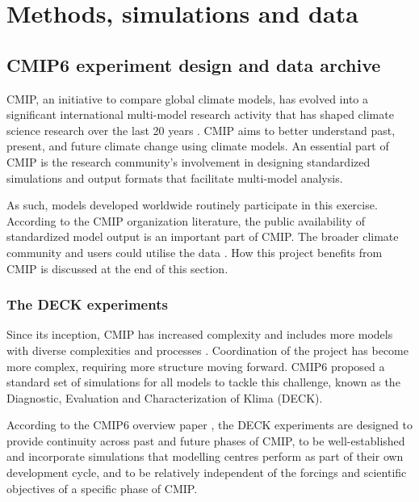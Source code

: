 
\chapter{Methods, simulations and data}
\label{ch2:title}


\section{CMIP6 experiment design and data archive}
\label{sec:2.CMIP6}

CMIP, an initiative to compare global climate models, has evolved into a significant international multi-model research activity that has shaped climate science research over the last 20 years \citep{eyringOverviewCoupledModel2016}. CMIP aims to better understand past, present, and future climate change using climate models. An essential part of CMIP is the research community's involvement in designing standardized simulations and output formats that facilitate multi-model analysis. 

As such, models developed worldwide routinely participate in this exercise. According to the CMIP organization literature, the public availability of standardized model output is an important part of CMIP. The broader climate community and users could utilise the data \citep{eyringOverviewCoupledModel2016}. How this project benefits from CMIP is discussed at the end of this section.

\subsection{The DECK experiments}

Since its inception, CMIP has increased complexity and includes more models with diverse complexities and processes \citep{eyringOverviewCoupledModel2016}. Coordination of the project has become more complex, requiring more structure moving forward. CMIP6 proposed a standard set of simulations for all models to tackle this challenge, known as the Diagnostic, Evaluation and Characterization of Klima (DECK). 

According to the CMIP6 overview paper \citep{eyringOverviewCoupledModel2016}, the DECK experiments are designed to provide continuity across past and future phases of CMIP, to be well-established and incorporate simulations that modelling centres perform as part of their own development cycle, and to be relatively independent of the forcings and scientific objectives of a specific phase of CMIP. 

